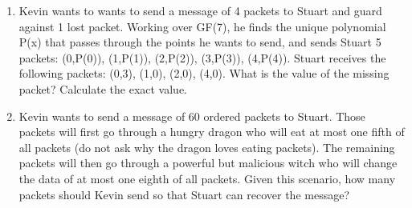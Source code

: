 \begin{enumerate}
\item Kevin wants to wants to send a message of 4 packets to Stuart and guard against 1 lost packet. Working over GF(7), he finds the unique polynomial P(x) that passes through the points he wants to send, and sends Stuart 5 packets: (0,P(0)), (1,P(1)), (2,P(2)), (3,P(3)), (4,P(4)). Stuart receives the following packets: (0,3), (1,0), (2,0), (4,0). What is the value of the missing packet? Calculate the exact value.
\vspace{4in}

\item Kevin wants to send a message of 60 ordered packets to Stuart. Those packets will first go
through a hungry dragon who will eat at most one fifth of all packets (do not ask why the dragon loves eating packets). The remaining packets will then go through a powerful but malicious witch who will change the data of at most one eighth of all packets. Given this scenario, how many packets should Kevin send so that Stuart can recover the message?

\end{enumerate}